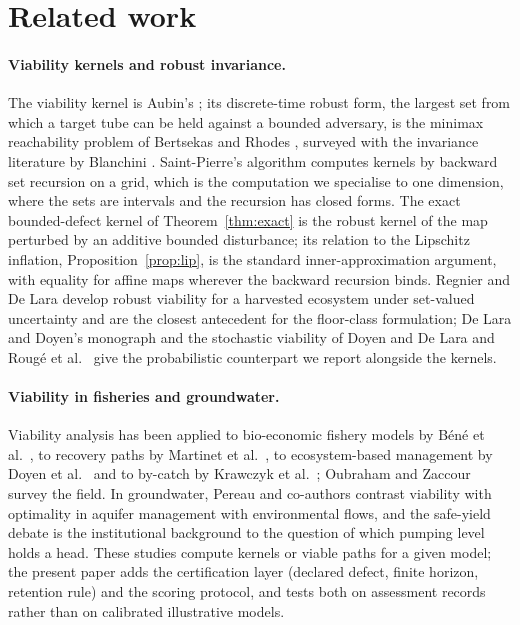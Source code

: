 \section{Related work}\label{sec:related}

\paragraph{Viability kernels and robust invariance.}
The viability kernel is Aubin's \cite{Aubin1991}; its discrete-time robust form, the largest set from which a target tube can be held against a bounded adversary, is the minimax reachability problem of Bertsekas and Rhodes \cite{BertsekasRhodes1971,Bertsekas1972}, surveyed with the invariance literature by Blanchini \cite{Blanchini1999}. Saint-Pierre's algorithm \cite{SaintPierre1994} computes kernels by backward set recursion on a grid, which is the computation we specialise to one dimension, where the sets are intervals and the recursion has closed forms. The exact bounded-defect kernel of Theorem~\ref{thm:exact} is the robust kernel of the map perturbed by an additive bounded disturbance; its relation to the Lipschitz inflation, Proposition~\ref{prop:lip}, is the standard inner-approximation argument, with equality for affine maps wherever the backward recursion binds. Regnier and De Lara \cite{RegnierDeLara2015} develop robust viability for a harvested ecosystem under set-valued uncertainty and are the closest antecedent for the floor-class formulation; De Lara and Doyen's monograph \cite{DeLaraDoyen2008} and the stochastic viability of Doyen and De Lara \cite{DoyenDeLara2010} and Rougé et al.\ \cite{Rouge2013} give the probabilistic counterpart we report alongside the kernels.

\paragraph{Viability in fisheries and groundwater.}
Viability analysis has been applied to bio-economic fishery models by Béné et al.\ \cite{Bene2001}, to recovery paths by Martinet et al.\ \cite{Martinet2007}, to ecosystem-based management by Doyen et al.\ \cite{Doyen2012} and to by-catch by Krawczyk et al.\ \cite{Krawczyk2013,KrawczykPharo2013}; Oubraham and Zaccour \cite{Oubraham2018} survey the field. In groundwater, Pereau and co-authors \cite{Pereau2018,Pereau2019} contrast viability with optimality in aquifer management with environmental flows, and the safe-yield debate \cite{Alley1999,Alley2004,Sophocleous1997,Sophocleous2000,Devlin2005} is the institutional background to the question of which pumping level holds a head. These studies compute kernels or viable paths for a given model; the present paper adds the certification layer (declared defect, finite horizon, retention rule) and the scoring protocol, and tests both on assessment records rather than on calibrated illustrative models.

